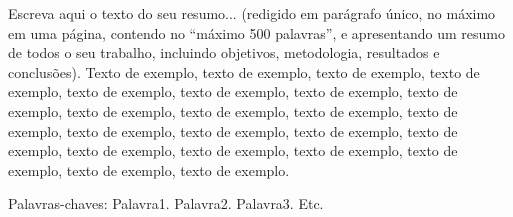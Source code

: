 \documentclass[
	12pt,				%
	oneside,			%
	a4paper,			%
	english,			%
	brazil				%
	]{abntex2ppgsi}
\begin{document}
\frenchspacing 


%
% 
%
\imprimircapa

\imprimirfolhaderosto


\setlength{\absparsep}{18pt} %
\begin{resumo}

Escreva aqui o texto do seu resumo... (redigido em parágrafo único, no máximo em uma página, contendo no ``máximo 500 palavras'', e apresentando um resumo de todos o seu trabalho, incluindo objetivos, metodologia, resultados e conclusões). Texto de exemplo, texto de exemplo, texto de exemplo, texto de exemplo, texto de exemplo, texto de exemplo, texto de exemplo, texto de exemplo, texto de exemplo, texto de exemplo, texto de exemplo, texto de exemplo, texto de exemplo, texto de exemplo, texto de exemplo, texto de exemplo, texto de exemplo, texto de exemplo, texto de exemplo, texto de exemplo, texto de exemplo, texto de exemplo.

Palavras-chaves: Palavra1. Palavra2. Palavra3. Etc.
\end{resumo}
\end{document}
